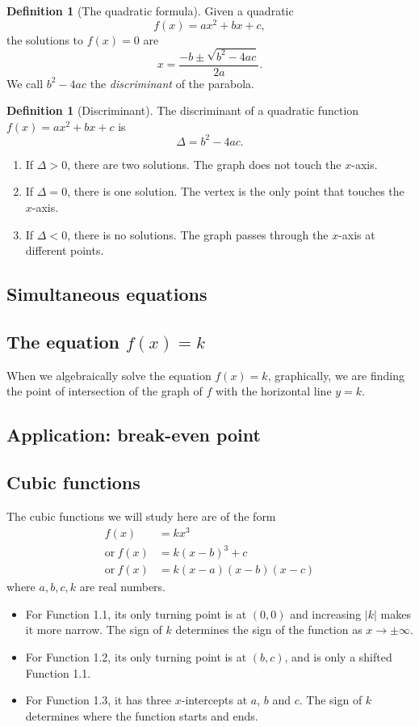 \documentclass[12pt]{book}
\theoremstyle{definition}
\newtheorem{defi}[theo]{Definition}
\begin{document}
  \begin{defi}[The quadratic formula]
    Given a quadratic \[f(x)=ax^2+bx+c,\] the solutions to $f(x)=0$ are
    \[x=\frac{-b\pm\sqrt{b^2-4ac}}{2a}.\] We call $b^2-4ac$ the \textit{discriminant} of the parabola.
  \end{defi}
  \begin{defi}[Discriminant]
    The discriminant of a quadratic function $f(x)=ax^2+bx+c$ is \[\Delta=b^2-4ac.\]
    \begin{enumerate}
      \item If $\Delta>0$, there are two solutions. The graph does not touch the $x$-axis.
      \item If $\Delta=0$, there is one solution. The vertex is the only point that touches the $x$-axis.
      \item If $\Delta<0$, there is no solutions. The graph passes through the $x$-axis at different points.
    \end{enumerate}
  \end{defi}
\subsection{Simultaneous equations}
\subsection{The equation $f(x)=k$}
  When we algebraically solve the equation $f(x)=k$, graphically, we are finding the point of intersection of the graph
  of $f$ with the horizontal line $y=k$.
\subsection{Application: break-even point}
\subsection{Cubic functions}
  The cubic functions we will study here are of the form
  \begin{align}
  f(x) &=kx^3\\
    \text{or}\ f(x) &=k(x-b)^3+c\\
    \text{or}\ f(x) &=k(x-a)(x-b)(x-c)
  \end{align}
  where $a,b,c,k$ are real numbers.
  \begin{itemize}
    \item For Function 1.1, its only turning point is at $(0,0)$ and increasing $|k|$ makes it more narrow. The sign of $k$
    determines the sign of the function as $x\to\pm\infty$.
    \item For Function 1.2, its only turning point is at $(b,c)$, and is only a shifted Function 1.1.
    \item For Function 1.3, it has three $x$-intercepts at $a$, $b$ and $c$. The sign of $k$ determines where the function
    starts and ends.
  \end{itemize}
\end{document}
